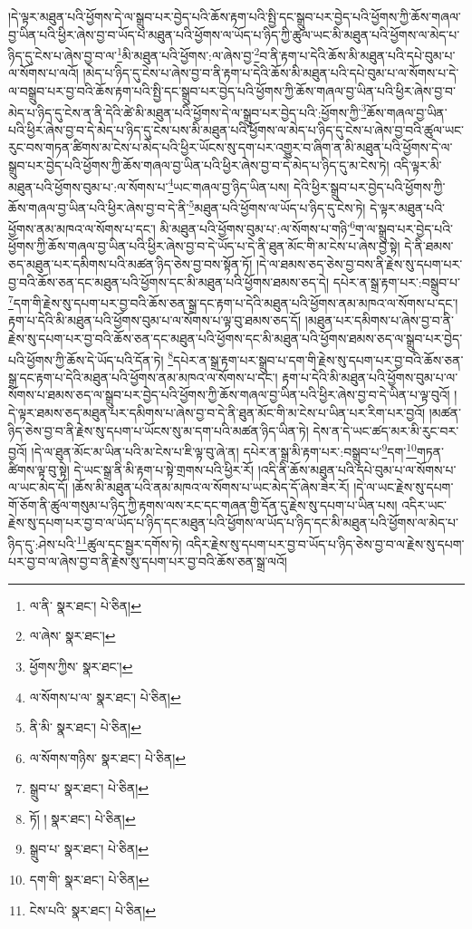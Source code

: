 །དེ་ལྟར་མཐུན་པའི་ཕྱོགས་དེ་ལ་སྒྲུབ་པར་བྱེད་པའི་ཆོས་རྟག་པའི་སྤྱི་དང་སྒྲུབ་པར་བྱེད་པའི་ཕྱོགས་ཀྱི་ཆོས་གཞལ་བྱ་ཡིན་པའི་ཕྱིར་ཞེས་བྱ་བ་ཡོད་པ་མཐུན་པའི་ཕྱོགས་ལ་ཡོད་པ་ཉིད་ཀྱི་ཚུལ་ཡང་མི་མཐུན་པའི་ཕྱོགས་ལ་མེད་པ་ཉིད་དུ་ངེས་པ་ཞེས་བྱ་བ་ལ་\footnote{ལ་ནི་  སྣར་ཐང་།  པེ་ཅིན། }མི་མཐུན་པའི་ཕྱོགས་:ལ་ཞེས་བྱ་\footnote{ལ་ཞེས་  སྣར་ཐང་། }བ་ནི་རྟག་པ་དེའི་ཆོས་མི་མཐུན་པའི་དཔེ་བུམ་པ་ལ་སོགས་པ་ལའོ། །མེད་པ་ཉིད་དུ་ངེས་པ་ཞེས་བྱ་བ་ནི་རྟག་པ་དེའི་ཆོས་མི་མཐུན་པའི་དཔེ་བུམ་པ་ལ་སོགས་པ་དེ་ལ་བསྒྲུབ་པར་བྱ་བའི་ཆོས་རྟག་པའི་སྤྱི་དང་སྒྲུབ་པར་བྱེད་པའི་ཕྱོགས་ཀྱི་ཆོས་གཞལ་བྱ་ཡིན་པའི་ཕྱིར་ཞེས་བྱ་བ་མེད་པ་ཉིད་དུ་ངེས་ན་ནི་དེའི་ཚེ་མི་མཐུན་པའི་ཕྱོགས་དེ་ལ་སྒྲུབ་པར་བྱེད་པའི་:ཕྱོགས་ཀྱི་\footnote{ཕྱོགས་ཀྱིས་  སྣར་ཐང་། }ཆོས་གཞལ་བྱ་ཡིན་པའི་ཕྱིར་ཞེས་བྱ་བ་དེ་མེད་པ་ཉིད་དུ་ངེས་པས་མི་མཐུན་པའི་ཕྱོགས་ལ་མེད་པ་ཉིད་དུ་ངེས་པ་ཞེས་བྱ་བའི་ཚུལ་ཡང་རུང་བས་གཏན་ཚིགས་མ་ངེས་པ་མེད་པའི་ཕྱིར་ཡོངས་སུ་དག་པར་འགྱུར་བ་ཞིག་ན་མི་མཐུན་པའི་ཕྱོགས་དེ་ལ་སྒྲུབ་པར་བྱེད་པའི་ཕྱོགས་ཀྱི་ཆོས་གཞལ་བྱ་ཡིན་པའི་ཕྱིར་ཞེས་བྱ་བ་དེ་མེད་པ་ཉིད་དུ་མ་ངེས་ཏེ། འདི་ལྟར་མི་མཐུན་པའི་ཕྱོགས་བུམ་པ་:ལ་སོགས་པ་\footnote{ལ་སོགས་པ་ལ་  སྣར་ཐང་།  པེ་ཅིན། }ཡང་གཞལ་བྱ་ཉིད་ཡིན་པས། དེའི་ཕྱིར་སྒྲུབ་པར་བྱེད་པའི་ཕྱོགས་ཀྱི་ཆོས་གཞལ་བྱ་ཡིན་པའི་ཕྱིར་ཞེས་བྱ་བ་དེ་ནི་\footnote{ནི་མི་  སྣར་ཐང་།  པེ་ཅིན། }མཐུན་པའི་ཕྱོགས་ལ་ཡོད་པ་ཉིད་དུ་ངེས་ཏེ། དེ་ལྟར་མཐུན་པའི་ཕྱོགས་ནམ་མཁའ་ལ་སོགས་པ་དང་། མི་མཐུན་པའི་ཕྱོགས་བུམ་པ་:ལ་སོགས་པ་གཉི་\footnote{ལ་སོགས་གཉིས་  སྣར་ཐང་།  པེ་ཅིན། }ག་ལ་སྒྲུབ་པར་བྱེད་པའི་ཕྱོགས་ཀྱི་ཆོས་གཞལ་བྱ་ཡིན་པའི་ཕྱིར་ཞེས་བྱ་བ་དེ་ཡོད་པ་དེ་ནི་ཐུན་མོང་གི་མ་ངེས་པ་ཞེས་བྱ་སྟེ། དེ་ནི་ཐམས་ཅད་མཐུན་པར་དམིགས་པའི་མཚན་ཉིད་ཅེས་བྱ་བས་སྟོན་ཏོ། །དེ་ལ་ཐམས་ཅད་ཅེས་བྱ་བས་ནི་རྗེས་སུ་དཔག་པར་བྱ་བའི་ཆོས་ཅན་དང་མཐུན་པའི་ཕྱོགས་དང་མི་མཐུན་པའི་ཕྱོགས་ཐམས་ཅད་དེ། དཔེར་ན་སྒྲ་རྟག་པར་:བསྒྲུབ་པ་\footnote{སྒྲུབ་པ་  སྣར་ཐང་།  པེ་ཅིན། }དག་གི་རྗེས་སུ་དཔག་པར་བྱ་བའི་ཆོས་ཅན་སྒྲ་དང་རྟག་པ་དེའི་མཐུན་པའི་ཕྱོགས་ནམ་མཁའ་ལ་སོགས་པ་དང་། རྟག་པ་དེའི་མི་མཐུན་པའི་ཕྱོགས་བུམ་པ་ལ་སོགས་པ་ལྟ་བུ་ཐམས་ཅད་དོ། །མཐུན་པར་དམིགས་པ་ཞེས་བྱ་བ་ནི་རྗེས་སུ་དཔག་པར་བྱ་བའི་ཆོས་ཅན་དང་མཐུན་པའི་ཕྱོགས་དང་མི་མཐུན་པའི་ཕྱོགས་ཐམས་ཅད་ལ་སྒྲུབ་པར་བྱེད་པའི་ཕྱོགས་ཀྱི་ཆོས་དེ་ཡོད་པའི་དོན་ཏེ། \footnote{ཏོ། །   སྣར་ཐང་།  པེ་ཅིན། }དཔེར་ན་སྒྲ་རྟག་པར་སྒྲུབ་པ་དག་གི་རྗེས་སུ་དཔག་པར་བྱ་བའི་ཆོས་ཅན་སྒྲ་དང་རྟག་པ་དེའི་མཐུན་པའི་ཕྱོགས་ནམ་མཁའ་ལ་སོགས་པ་དང་། རྟག་པ་དེའི་མི་མཐུན་པའི་ཕྱོགས་བུམ་པ་ལ་སོགས་པ་ཐམས་ཅད་ལ་སྒྲུབ་པར་བྱེད་པའི་ཕྱོགས་ཀྱི་ཆོས་གཞལ་བྱ་ཡིན་པའི་ཕྱིར་ཞེས་བྱ་བ་དེ་ཡིན་པ་ལྟ་བུའོ། །དེ་ལྟར་ཐམས་ཅད་མཐུན་པར་དམིགས་པ་ཞེས་བྱ་བ་དེ་ནི་ཐུན་མོང་གི་མ་ངེས་པ་ཡིན་པར་རིག་པར་བྱའོ། །མཚན་ཉིད་ཅེས་བྱ་བ་ནི་རྗེས་སུ་དཔག་པ་ཡོངས་སུ་མ་དག་པའི་མཚན་ཉིད་ཡིན་ཏེ། དེས་ན་དེ་ཡང་ཚད་མར་མི་རུང་བར་བྱའོ། །དེ་ལ་ཐུན་མོང་མ་ཡིན་པའི་མ་ངེས་པ་ཇི་ལྟ་བུ་ཞེ་ན། དཔེར་ན་སྒྲ་མི་རྟག་པར་:བསྒྲུབ་པ་\footnote{སྒྲུབ་པ་  སྣར་ཐང་།  པེ་ཅིན། }དག་\footnote{དག་གི་  སྣར་ཐང་།  པེ་ཅིན། }གཏན་ཚིགས་ལྟ་བུ་སྟེ། དེ་ཡང་སྒྲ་ནི་མི་རྟག་པ་སྟེ་གྲགས་པའི་ཕྱིར་རོ། །འདི་ནི་ཆོས་མཐུན་པའི་དཔེ་བུམ་པ་ལ་སོགས་པ་ལ་ཡང་མེད་དོ། །ཆོས་མི་མཐུན་པའི་ནམ་མཁའ་ལ་སོགས་པ་ཡང་མེད་དོ་ཞེས་ཟེར་རོ། །དེ་ལ་ཡང་རྗེས་སུ་དཔག་གོ་ཅོག་ནི་ཚུལ་གསུམ་པ་ཉིད་ཀྱི་རྟགས་ལས་རང་དང་གཞན་གྱི་དོན་དུ་རྗེས་སུ་དཔག་པ་ཡིན་པས། འདིར་ཡང་རྗེས་སུ་དཔག་པར་བྱ་བ་ལ་ཡོད་པ་ཉིད་དང་མཐུན་པའི་ཕྱོགས་ལ་ཡོད་པ་ཉིད་དང་མི་མཐུན་པའི་ཕྱོགས་ལ་མེད་པ་ཉིད་དུ་:ཤེས་པའི་\footnote{ངེས་པའི་  སྣར་ཐང་།  པེ་ཅིན། }ཚུལ་དང་སྦྱར་དགོས་ཏེ། འདིར་རྗེས་སུ་དཔག་པར་བྱ་བ་ཡོད་པ་ཉིད་ཅེས་བྱ་བ་ལ་རྗེས་སུ་དཔག་པར་བྱ་བ་ལ་ཞེས་བྱ་བ་ནི་རྗེས་སུ་དཔག་པར་བྱ་བའི་ཆོས་ཅན་སྒྲ་ལའོ། 
